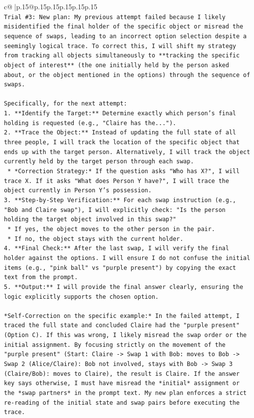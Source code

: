 \documentclass{article}
\begin{document}
{\begin{supertabular}{c@{$\;$}|p{.15\linewidth}@{}p{.15\linewidth}p{.15\linewidth}p{.15\linewidth}p{.15\linewidth}p{.15\linewidth}}
{{{\\ 
\texttt{Trial \#3: New plan: My previous attempt failed because I likely misidentified the final holder of the specific object or misread the sequence of swaps, leading to an incorrect option selection despite a seemingly logical trace. To correct this, I will shift my strategy from tracking all objects simultaneously to **tracking the specific object of interest** (the one initially held by the person asked about, or the object mentioned in the options) through the sequence of swaps.} \\
\\ 
\texttt{Specifically, for the next attempt:} \\
\texttt{1.  **Identify the Target:** Determine exactly which person's final holding is requested (e.g., "Claire has the...").} \\
\texttt{2.  **Trace the Object:** Instead of updating the full state of all three people, I will track the location of the specific object that ends up with the target person. Alternatively, I will track the object currently held by the target person through each swap.} \\
\texttt{    *   *Correction Strategy:* If the question asks "Who has X?", I will trace X. If it asks "What does Person Y have?", I will trace the object currently in Person Y's possession.} \\
\texttt{3.  **Step{-}by{-}Step Verification:** For each swap instruction (e.g., "Bob and Claire swap"), I will explicitly check: "Is the person holding the target object involved in this swap?"} \\
\texttt{    *   If yes, the object moves to the other person in the pair.} \\
\texttt{    *   If no, the object stays with the current holder.} \\
\texttt{4.  **Final Check:** After the last swap, I will verify the final holder against the options. I will ensure I do not confuse the initial items (e.g., "pink ball" vs "purple present") by copying the exact text from the prompt.} \\
\texttt{5.  **Output:** I will provide the final answer clearly, ensuring the logic explicitly supports the chosen option.} \\
\\ 
\texttt{*Self{-}Correction on the specific example:* In the failed attempt, I traced the full state and concluded Claire had the "purple present" (Option C). If this was wrong, I likely misread the swap order or the initial assignment. By focusing strictly on the movement of the "purple present" (Start: Claire {-}> Swap 1 with Bob: moves to Bob {-}> Swap 2 (Alice/Claire): Bob not involved, stays with Bob {-}> Swap 3 (Claire/Bob): moves to Claire), the result is Claire. If the answer key says otherwise, I must have misread the *initial* assignment or the *swap partners* in the prompt text. My new plan enforces a strict re{-}reading of the initial state and swap pairs before executing the trace.} \\
}}}
\end{supertabular}}
\end{document}
